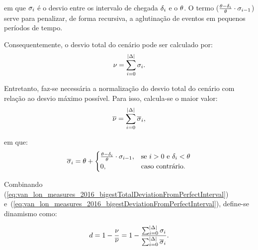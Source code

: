 \noindent em que $\sigma_i$ é o desvio entre os intervalo 
de chegada $\delta_i$ e o $\theta$. O
termo ($\frac{\theta-\delta_i}
{\theta} \cdot \sigma_{i-1}$) serve para 
penalizar, de forma recursiva, a aglutinação de eventos em pequenos 
períodos de tempo.


Consequentemente, o desvio total do cenário pode ser calculado por:
%
\begin{equation}
    \nu = 
    \sum_{i=0}^{|\Delta|} \sigma_i.
    \label{eq:van_lon_measures_2016_totalDeviationFromPerfectInterval}
\end{equation}

Entretanto, faz-se necessária a normalização do desvio total do cenário com
relação ao desvio máximo possível.
Para isso, calcula-se o maior valor:
%
\begin{equation}
    \overline{\nu} =
    \sum_{i=0}^{|\Delta|} 
		\overline{\sigma}_i,
    \label{eq:van_lon_measures_2016_bigestTotalDeviationFromPerfectInterval}
\end{equation}

\noindent em que:
%
\begin{equation}
    \overline{\sigma}_i = \theta + 
        \begin{cases}
            \frac{\theta - \delta_i}
								 {\theta} 
						\cdot \sigma_{i-1},
						& \text{se $i>0$ e $\delta_i 
                    < \theta$}\\
            0, & \text{caso contrário.}
        \end{cases}
    \label{eq:van_lon_measures_2016_bigestDeviationFromPerfectInterval}    
\end{equation}

Combinando  
(\ref{eq:van_lon_measures_2016_bigestTotalDeviationFromPerfectInterval})
e~(\ref{eq:van_lon_measures_2016_bigestDeviationFromPerfectInterval}), define-se 
dinamismo como:

\begin{equation}
      d = 1 - \frac{\nu}{\overline{\nu}} = 1 -
      \frac{\sum_{i=0}^{|\Delta|}
			\sigma_i}{\sum_{i=0}^{|\Delta|}
      \overline{\sigma}_i}.
      \label{eq:van_lon_measures_2016_dynamism}
\end{equation}

